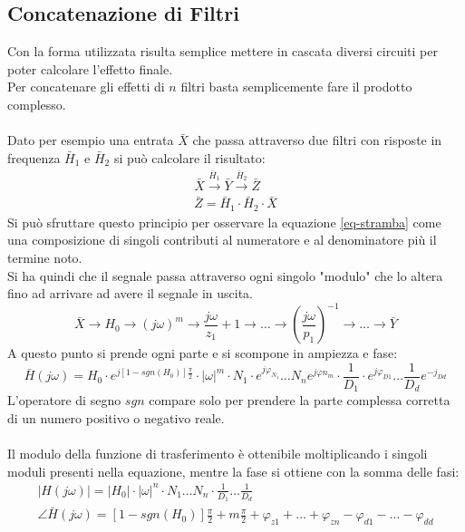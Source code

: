 \documentclass[../main.tex]{subfiles}
\begin{document}
	\subsection{Concatenazione di Filtri}
	Con la forma utilizzata risulta semplice mettere in cascata diversi circuiti per poter calcolare l'effetto finale.\\
	Per concatenare gli effetti di $n$ filtri basta semplicemente fare il prodotto complesso.\\\\
	Dato per esempio una entrata $\bar X$ che passa attraverso due filtri con risposte in frequenza $\bar H_1$ e $\bar H_2$ si può calcolare il risultato:
	\begin{gather}
		\bar X \xrightarrow{\bar H_1} \bar Y \xrightarrow{\bar H_2} \bar Z \\
		\bar Z = \bar H_1 \cdot \bar H_2 \cdot \bar X
	\end{gather}
	Si può sfruttare questo principio per osservare la equazione \ref{eq-stramba} come una composizione di singoli contributi al numeratore e al denominatore più il termine noto. \\
	Si ha quindi che il segnale passa attraverso ogni singolo "modulo" che lo altera fino ad arrivare ad avere il segnale in uscita.
	\begin{equation}
		\bar X \rightarrow H_0 \rightarrow (j\omega)^m \rightarrow \frac{j\omega}{z_1} + 1 \rightarrow \dots \rightarrow \left(\frac{j\omega}{p_1}\right)^{-1}\rightarrow \dots \rightarrow \bar Y	
	\end{equation}
	A questo punto si prende ogni parte e si scompone in ampiezza e fase:
	\begin{equation}
		\bar H(j\omega) = H_0 \cdot e^{j[1- sgn (H_0)]\frac{\pi}{2}} \cdot |\omega| ^m \cdot N_1 \cdot e^{j\varphi_{N_1}} \dots N_n e^{j\varphi n_m}\cdot \frac{1}{D_1}\cdot e^{j\varphi_{D1}} \dots \frac{1}{D_d}e^{-j_{Dd}}	
	\end{equation}
	L'operatore di segno $sgn$ compare solo per prendere la parte complessa corretta di un numero positivo o negativo reale.\\\\
	Il modulo della funzione di trasferimento è ottenibile moltiplicando i singoli moduli presenti nella equazione, mentre la fase si ottiene con la somma delle fasi:
	\begin{gather}
		|H(j\omega)| = |H_0|\cdot |\omega|^n \cdot N_1 \dots N_n\cdot \frac{1}{D_1}\dots \frac{1}{D_d}	\\
		\angle \bar H(j\omega) = [1- sgn (H_0)]\frac{\pi}{2}+m\frac{\pi}{2}+\varphi_{z1}+\dots+\varphi_{zn}-\varphi_{d1}-\dots-\varphi_{dd}
	\end{gather}	
\end{document}
